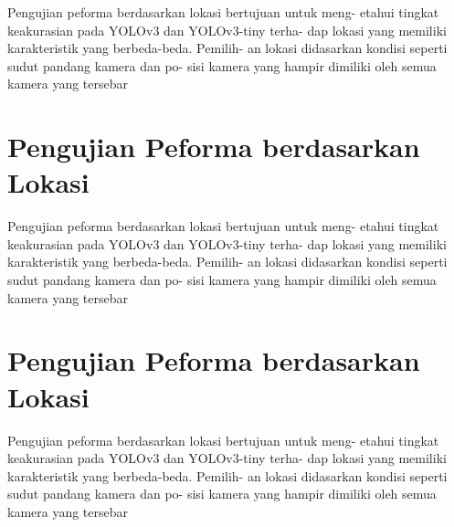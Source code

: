 Pengujian peforma berdasarkan lokasi bertujuan untuk meng- etahui tingkat keakurasian pada YOLOv3 dan YOLOv3-tiny terha- dap lokasi yang memiliki karakteristik yang berbeda-beda. Pemilih- an lokasi didasarkan kondisi seperti sudut pandang kamera dan po- sisi kamera yang hampir dimiliki oleh semua kamera yang tersebar

\section{Pengujian Peforma berdasarkan Lokasi}
\vspace{1ex}

Pengujian peforma berdasarkan lokasi bertujuan untuk meng- etahui tingkat keakurasian pada YOLOv3 dan YOLOv3-tiny terha- dap lokasi yang memiliki karakteristik yang berbeda-beda. Pemilih- an lokasi didasarkan kondisi seperti sudut pandang kamera dan po- sisi kamera yang hampir dimiliki oleh semua kamera yang tersebar

\section{Pengujian Peforma berdasarkan Lokasi}
\vspace{1ex}

Pengujian peforma berdasarkan lokasi bertujuan untuk meng- etahui tingkat keakurasian pada YOLOv3 dan YOLOv3-tiny terha- dap lokasi yang memiliki karakteristik yang berbeda-beda. Pemilih- an lokasi didasarkan kondisi seperti sudut pandang kamera dan po- sisi kamera yang hampir dimiliki oleh semua kamera yang tersebar
